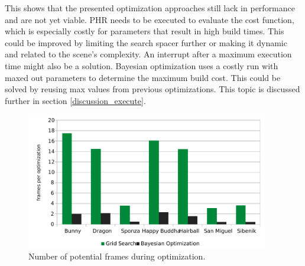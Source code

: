This shows that the presented optimization approaches still lack in performance and are not yet viable. PHR needs to be executed to evaluate the cost function, which is especially costly for parameters that result in high build times. This could be improved by limiting the search spacer further or making it dynamic and related to the scene's complexity. An interrupt after a maximum execution time might also be a solution. Bayesian optimization uses a costly run with maxed out parameters to determine the maximum build cost. This could be solved by reusing max values from previous optimizations. This topic is discussed further in section \ref{discussion_execute}.
\begin{figure}[H]
    \centering
    \includegraphics[width=300pt]{images/frame_per_optimization.pdf}
    \caption{Number of potential frames during optimization.}
    \label{fig:optimization}
\end{figure}
\clearpage
